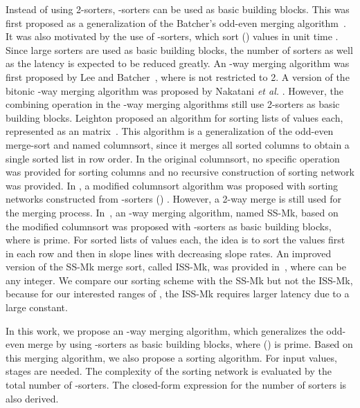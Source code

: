 \documentclass[10pt,journal,cspaper,compsoc]{IEEEtran}
\begin{document}
Instead of using 2-sorters, -sorters can be used as basic building blocks. This was first proposed as a generalization of the Batcher's odd-even merging algorithm~\cite{Lee95multiway}. It was also motivated by the use of -sorters, which sort  () values in unit time \cite{parker1989constructing,beigel1990sorting}. Since large sorters are used as basic building blocks, the number of sorters as well as the latency is expected to be reduced greatly.
An -way merging algorithm was first proposed by Lee and Batcher~\cite{Lee95multiway}, where  is not restricted to 2. A version of the bitonic -way merging algorithm was proposed by Nakatani \textit{et al.} \cite{nakatani1989e1,lee1994sorting}. However, the combining operation in the -way merging algorithms still use 2-sorters as basic building blocks. Leighton proposed an algorithm for sorting  lists of  values each, represented as an  matrix~\cite{leighton1984tight}. This algorithm is a generalization of the odd-even merge-sort and named columnsort, since it merges all sorted columns to obtain a single sorted list in row order. In the original columnsort, no specific operation was provided for sorting columns and no recursive construction of sorting network was provided. In \cite{parker1989constructing}, a modified columnsort algorithm was proposed with sorting networks constructed from -sorters () \cite{liszka1993generalized}. However, a 2-way merge is still used for the merging process.
In~\cite{gao1997sloping}, an -way merging algorithm, named SS-Mk, based on the modified columnsort was proposed with -sorters as basic building blocks, where  is prime. For  sorted lists of  values each, the idea is to sort the  values first in each row and then in slope lines with decreasing slope rates. An improved version of the SS-Mk merge sort, called ISS-Mk, was provided in~\cite{zhao1998efficient}, where  can be any integer. We compare our sorting scheme with the SS-Mk but not the ISS-Mk, because for our interested ranges of , the ISS-Mk requires larger latency due to a large constant.

In this work, we propose an -way merging algorithm, which generalizes the odd-even merge by using -sorters as basic building blocks, where  () is prime. Based on this merging algorithm, we also propose a sorting algorithm. For  input values,  stages are needed. The complexity of the sorting network is evaluated by the total number of -sorters. The closed-form expression for the number of sorters is also derived.
\end{document}
